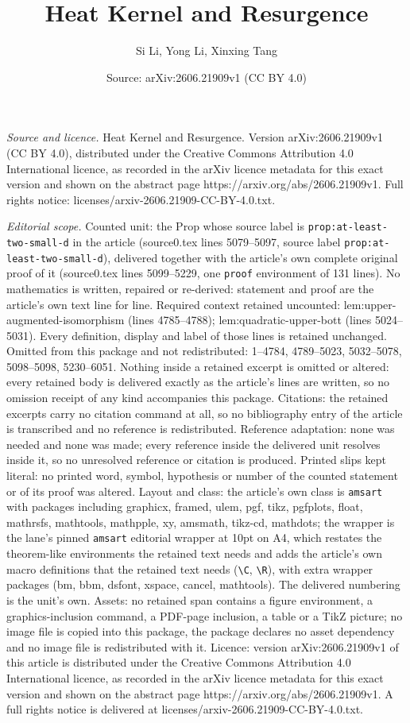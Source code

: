 \documentclass[10pt,a4paper]{amsart}
\title[Heat Kernel and Resurgence]{Heat Kernel and Resurgence}
\author{Si Li, Yong Li, Xinxing Tang}
\date{Source: arXiv:2606.21909v1 (CC BY 4.0)}
\begin{document}
\maketitle

\noindent\emph{Source and licence.} Heat Kernel and Resurgence. Version arXiv:2606.21909v1 (CC BY 4.0), distributed under the Creative Commons Attribution 4.0 International licence, as recorded in the arXiv licence metadata for this exact version and shown on the abstract page https://arxiv.org/abs/2606.21909v1. Full rights notice: licenses/arxiv-2606.21909-CC-BY-4.0.txt.\par\smallskip

\noindent\textit{Editorial scope.} Counted unit: the Prop whose source label is \texttt{prop:at-least-two-small-d} in the article (source0.tex lines 5079--5097, source label \texttt{prop:at-least-two-small-d}), delivered together with the article's own complete original proof of it (source0.tex lines 5099--5229, one \texttt{proof} environment of 131 lines). No mathematics is written, repaired or re-derived: statement and proof are the article's own text line for line. Required context retained uncounted: lem:upper-augmented-isomorphism (lines 4785--4788); lem:quadratic-upper-bott (lines 5024--5031). Every definition, display and label of those lines is retained unchanged. Omitted from this package and not redistributed: 1--4784, 4789--5023, 5032--5078, 5098--5098, 5230--6051. Nothing inside a retained excerpt is omitted or altered: every retained body is delivered exactly as the article's lines are written, so no omission receipt of any kind accompanies this package. Citations: the retained excerpts carry no citation command at all, so no bibliography entry of the article is transcribed and no reference is redistributed. Reference adaptation: none was needed and none was made; every reference inside the delivered unit resolves inside it, so no unresolved reference or citation is produced. Printed slips kept literal: no printed word, symbol, hypothesis or number of the counted statement or of its proof was altered. Layout and class: the article's own class is \texttt{amsart} with packages including graphicx, framed, ulem, pgf, tikz, pgfplots, float, mathrsfs, mathtools, mathpple, xy, amsmath, tikz-cd, mathdots; the wrapper is the lane's pinned \texttt{amsart} editorial wrapper at 10pt on A4, which restates the theorem-like environments the retained text needs and adds the article's own macro definitions that the retained text needs (\texttt{\textbackslash C}, \texttt{\textbackslash R}), with extra wrapper packages (bm, bbm, dsfont, xspace, cancel, mathtools). The delivered numbering is the unit's own. Assets: no retained span contains a figure environment, a graphics-inclusion command, a PDF-page inclusion, a table or a TikZ picture; no image file is copied into this package, the package declares no asset dependency and no image file is redistributed with it. Licence: version arXiv:2606.21909v1 of this article is distributed under the Creative Commons Attribution 4.0 International licence, as recorded in the arXiv licence metadata for this exact version and shown on the abstract page https://arxiv.org/abs/2606.21909v1. A full rights notice is delivered at licenses/arxiv-2606.21909-CC-BY-4.0.txt. 
\end{document}

